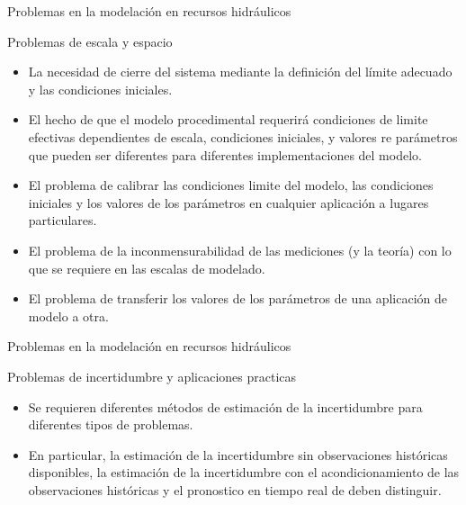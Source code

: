 \documentclass[
10pt,
aspectratio=169,
]{beamer}
\begin{document}
\begin{frame}{Problemas en la modelaci\'on en recursos hidr\'aulicos}
\begin{block}{Problemas de escala y espacio}
\begin{itemize}
\item La necesidad de cierre del sistema mediante la definici\'on del l\'imite adecuado y las condiciones iniciales.
\item El hecho de que el modelo procedimental requerirá condiciones de limite efectivas dependientes de escala, condiciones iniciales, y valores re parámetros que pueden ser diferentes para diferentes implementaciones del modelo.
\item El problema de calibrar las condiciones limite del modelo, las condiciones iniciales y los valores de los parámetros en cualquier aplicación a lugares particulares.
\item El problema de la inconmensurabilidad de las mediciones (y la teoría) con lo que se requiere en las escalas de modelado.
\item El problema de transferir los valores de los parámetros de una aplicación de modelo a otra.
\end{itemize}
\end{block}
\end{frame}

\begin{frame}{Problemas en la modelaci\'on en recursos hidr\'aulicos}
\begin{block}{Problemas de incertidumbre y aplicaciones practicas}
\begin{itemize}
\item Se requieren diferentes métodos de estimación de la incertidumbre para diferentes tipos de problemas.
\item En particular, la estimación de la incertidumbre sin observaciones históricas disponibles, la estimación de la incertidumbre con el acondicionamiento de las observaciones históricas y el pronostico en tiempo real de deben distinguir.
\end{itemize}
\end{block}
\end{frame}
\end{document}

